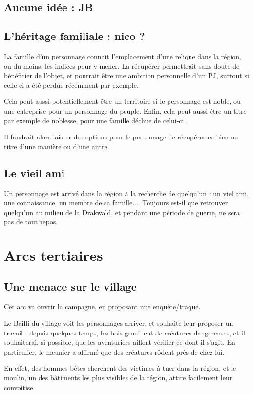 \documentclass[10pt,a4paper]{book}
\begin{document}
\subsection{Aucune idée : JB}
\subsection{L'héritage familiale : nico ?}
La famille d'un personnage connait l'emplacement d'une relique dans la région, ou du moins, les indices pour y mener. La récupérer permettrait sans doute de bénéficier de l'objet, et pourrait être une ambition personnelle d'un PJ, surtout si celle-ci a été perdue récemment par exemple.

Cela peut aussi potentiellement être un territoire si le personnage est noble, ou une entreprise pour un personnage du peuple. Enfin, cela peut aussi être un titre par exemple de noblesse, pour une famille déchue de celui-ci.

Il faudrait alors laisser des options pour le personnage de récupérer ce bien ou titre d'une manière ou d'une autre.
\subsection{Le vieil ami}
Un personnage est arrivé dans la région à la recherche de quelqu'un : un viel ami, une connaissance, un membre de sa famille.... Toujours est-il que retrouver quelqu'un au milieu de la Drakwald, et pendant une période de guerre, ne sera pas de tout repos.
\section{Arcs tertiaires}
\subsection{Une menace sur le village}
Cet arc va ouvrir la campagne, en proposant une enquête/traque.

Le Bailli du village voit les personnages arriver, et souhaite leur proposer un travail : depuis quelques temps, les bois grouillent de créatures dangereuses, et il souhaiterai, si possible, que les aventuriers aillent vérifier ce dont il s'agit. En particulier, le meunier a affirmé que des créatures rôdent près de chez lui.

En effet, des hommes-bêtes cherchent des victimes à tuer dans la région, et le moulin, un des bâtiments les plus visibles de la région, attire facilement leur convoitise.
\end{document}

